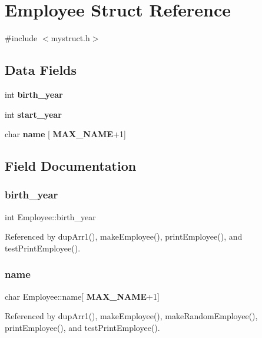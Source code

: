 \section{Employee Struct Reference}
\label{structEmployee}


{\ttfamily \#include $<$mystruct.\+h$>$}

\subsection*{Data Fields}
\begin{DoxyCompactItemize}
\item 
int \textbf{ birth\+\_\+year}
\item 
int \textbf{ start\+\_\+year}
\item 
char \textbf{ name} [\textbf{ M\+A\+X\+\_\+\+N\+A\+ME}+1]
\end{DoxyCompactItemize}


\subsection{Field Documentation}
\mbox{\label{structEmployee_a760204f198562c478aa489b14c7d1d29}} 
\subsubsection{birth\+\_\+year}
{\footnotesize\ttfamily int Employee\+::birth\+\_\+year}



Referenced by dup\+Arr1(), make\+Employee(), print\+Employee(), and test\+Print\+Employee().

\mbox{\label{structEmployee_acd7c4b846e2076017e5fe21ed23ac8dd}} 
\subsubsection{name}
{\footnotesize\ttfamily char Employee\+::name[\textbf{ M\+A\+X\+\_\+\+N\+A\+ME}+1]}



Referenced by dup\+Arr1(), make\+Employee(), make\+Random\+Employee(), print\+Employee(), and test\+Print\+Employee().

\mbox{\label{structEmployee_a64042e9bd1a3451ba0349b59f21325a6}} 
